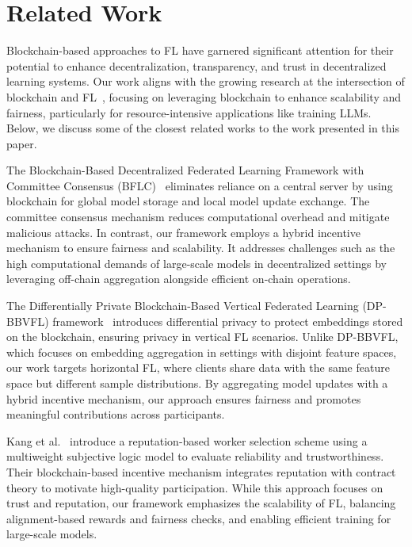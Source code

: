 \section{Related Work}
\label{sec:related_work}

Blockchain-based approaches to FL have garnered significant attention for their potential to enhance decentralization, transparency, and trust in decentralized learning systems. Our work aligns with the growing research at the intersection of blockchain and FL~\cite{issa2023blockchain}, focusing on leveraging blockchain to enhance scalability and fairness, particularly for resource-intensive applications like training LLMs. Below, we discuss some of the closest related works to the work presented in this paper.


The Blockchain-Based Decentralized Federated Learning Framework with Committee Consensus (BFLC)~\cite{li2020blockchain} eliminates reliance on a central server by using blockchain for global model storage and local model update exchange. The committee consensus mechanism reduces computational overhead and mitigate malicious attacks. In contrast, our framework employs a hybrid incentive mechanism to ensure fairness and scalability. It addresses challenges such as the high computational demands of large-scale models in decentralized settings by leveraging off-chain aggregation alongside efficient on-chain operations.


The Differentially Private Blockchain-Based Vertical Federated Learning (DP-BBVFL) framework~\cite{tran2024adifferentially} introduces differential privacy to protect embeddings stored on the blockchain, ensuring privacy in vertical FL scenarios. Unlike DP-BBVFL, which focuses on embedding aggregation in settings with disjoint feature spaces, our work targets horizontal FL, where clients share data with the same feature space but different sample distributions. By aggregating model updates with a hybrid incentive mechanism, our approach ensures fairness and promotes meaningful contributions across participants.


Kang et al.~\cite{kang2019incentive} introduce a reputation-based worker selection scheme using a multiweight subjective logic model to evaluate reliability and trustworthiness. Their blockchain-based incentive mechanism integrates reputation with contract theory to motivate high-quality participation. While this approach focuses on trust and reputation, our framework emphasizes the scalability of FL, balancing alignment-based rewards and fairness checks, and enabling efficient training for large-scale models.

